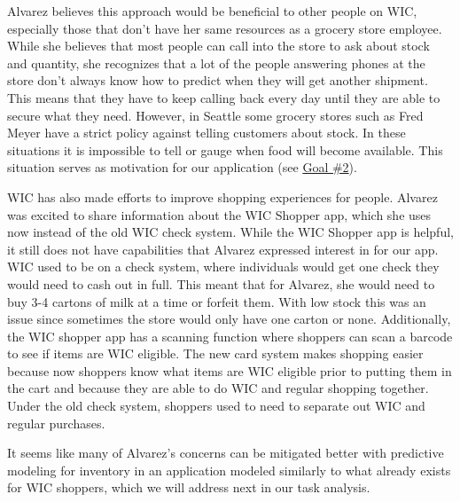 \documentclass{article}
\begin{document}
Alvarez believes this approach would be beneficial to other people on WIC, especially those that don’t have her same resources as a grocery store employee. While she believes that most people can call into the store to ask about stock and quantity, she recognizes that a lot of the people answering phones at the store don’t always know how to predict when they will get another shipment. This means that they have to keep calling back every day until they are able to secure what they need. However, in Seattle some grocery stores such as Fred Meyer have a strict policy against telling customers about stock. In these situations it is impossible to tell or gauge when food will become available. This situation serves as motivation for our application (see \hyperref[sec:goal2]{Goal \#2}). \par
WIC has also made efforts to improve shopping experiences for people. Alvarez was excited to share information about the WIC Shopper app, which she uses now instead of the old WIC check system. While the WIC Shopper app is helpful, it still does not have capabilities that Alvarez expressed interest in for our app. WIC used to be on a check system, where individuals would get one check they would need to cash out in full. This meant that for Alvarez, she would need to buy 3-4 cartons of milk at a time or forfeit them. With low stock this was an issue since sometimes the store would only have one carton or none. Additionally, the WIC shopper app has a scanning function where shoppers can scan a barcode to see if items are WIC eligible. The new card system makes shopping easier because now shoppers know what items are WIC eligible prior to putting them in the cart and because they are able to do WIC and regular shopping together. Under the old check system, shoppers used to need to separate out WIC and regular purchases. \par
It seems like many of Alvarez’s concerns can be mitigated better with predictive modeling for inventory in an application modeled similarly to what already exists for WIC shoppers, which we will address next in our task analysis. \par
\end{document}
